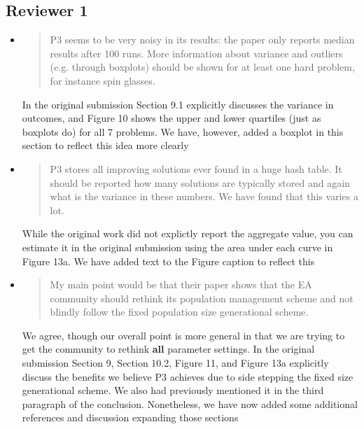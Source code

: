 \documentclass[]{article}
\begin{document}
\subsection{Reviewer 1}
\begin{itemize}

\item
\begin{quote}
P3 seems to be very noisy in its results: the paper only reports median results after 100 runs. More information about variance and outliers (e.g. through boxplots) should be shown for at least one hard problem, for instance spin glasses. 
\end{quote}

In the original submission Section 9.1 explicitly discusses the variance in outcomes, and Figure 10 shows the upper and lower quartiles (just as boxplots do) for all 7 problems. We have, however, added a boxplot in this section to reflect this idea more clearly

\item
\begin{quote}
P3 stores all improving solutions ever found in a huge hash table. It should be reported how many solutions are typically stored and again what is the variance in these numbers. We have found that this varies a lot. 
\end{quote}

While the original work did not explictly report the aggregate value, you can estimate it in the original submission using the area under each curve in Figure 13a. We have added text to the Figure caption to reflect this

\item
\begin{quote}
My main point would be that their paper shows that the EA community should rethink its population management scheme and not blindly follow the fixed population size generational scheme.
\end{quote}

We agree, though our overall point is more general in that we are trying to get the community to rethink \textbf{all} parameter settings. In the original submission Section 9, Section 10.2,  Figure 11, and Figure 13a explicitly discuss the benefits we believe P3 achieves due to side stepping the fixed size generational scheme. We also had previously mentioned it in the third paragraph of the conclusion. Nonetheless, we have now added some additional references and discussion expanding those sections


\end{itemize}
\end{document}
